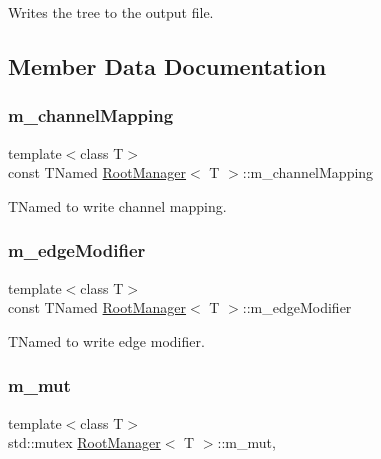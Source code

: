 Writes the tree to the output file. 



\subsection{Member Data Documentation}
\mbox{\label{class_root_manager_a4d92834cf49004700cafa3afa3659cd5}} 
\subsubsection{\texorpdfstring{m\+\_\+channel\+Mapping}{m\_channelMapping}}
{\footnotesize\ttfamily template$<$class T$>$ \\
const T\+Named \hyperlink{class_root_manager}{Root\+Manager}$<$ T $>$\+::m\+\_\+channel\+Mapping\hspace{0.3cm}{\ttfamily [private]}}



T\+Named to write channel mapping. 

\mbox{\label{class_root_manager_a3f17186761c3e5b61e569bc3f3946ddb}} 
\subsubsection{\texorpdfstring{m\+\_\+edge\+Modifier}{m\_edgeModifier}}
{\footnotesize\ttfamily template$<$class T$>$ \\
const T\+Named \hyperlink{class_root_manager}{Root\+Manager}$<$ T $>$\+::m\+\_\+edge\+Modifier\hspace{0.3cm}{\ttfamily [private]}}



T\+Named to write edge modifier. 

\mbox{\label{class_root_manager_a8f8a185d6d25b3e1207416c7cd8c333c}} 
\subsubsection{\texorpdfstring{m\+\_\+mut}{m\_mut}}
{\footnotesize\ttfamily template$<$class T$>$ \\
std\+::mutex \hyperlink{class_root_manager}{Root\+Manager}$<$ T $>$\+::m\+\_\+mut\hspace{0.3cm}{\ttfamily [mutable]}, {\ttfamily [protected]}}



